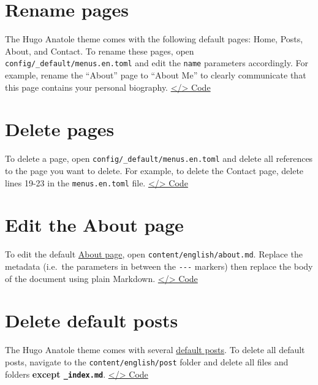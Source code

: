 \documentclass[
]{book}
\begin{document}
\hypertarget{rename-pages}{%
\section{Rename pages}\label{rename-pages}}

The Hugo Anatole theme comes with the following default pages: Home, Posts, About, and Contact. To rename these pages, open \texttt{config/\_default/menus.en.toml} and edit the \texttt{name} parameters accordingly. For example, rename the ``About'' page to ``About Me'' to clearly communicate that this page contains your personal biography. \href{https://github.com/dannymorris/r4sites-anatole-custom/blob/master/config/_default/menus.en.toml\#L14}{\textless/\textgreater{} Code}

\hypertarget{delete-pages}{%
\section{Delete pages}\label{delete-pages}}

To delete a page, open \texttt{config/\_default/menus.en.toml} and delete all references to the page you want to delete. For example, to delete the Contact page, delete lines 19-23 in the \texttt{menus.en.toml} file. \href{https://github.com/dannymorris/r4sites-anatole-custom/blob/master/config/_default/menus.en.toml\#L19-L23}{\textless/\textgreater{} Code}

\hypertarget{edit-the-about-page}{%
\section{Edit the About page}\label{edit-the-about-page}}

To edit the default \href{https://r4sites-anatole-custom.netlify.app/about/}{About page}, open \texttt{content/english/about.md}. Replace the metadata (i.e.~the parameters in between the \texttt{-\/-\/-} markers) then replace the body of the document using plain Markdown. \href{https://raw.githubusercontent.com/dannymorris/r4sites-anatole-custom/master/content/english/about.md}{\textless/\textgreater{} Code}

\hypertarget{delete-default-posts}{%
\section{Delete default posts}\label{delete-default-posts}}

The Hugo Anatole theme comes with several \href{https://themes.gohugo.io//theme/anatole/post/}{default posts}. To delete all default posts, navigate to the \texttt{content/english/post} folder and delete all files and folders \textbf{except \texttt{\_index.md}}. \href{https://github.com/dannymorris/r4sites-anatole-custom/tree/master/content/english/post}{\textless/\textgreater{} Code}
\end{document}
